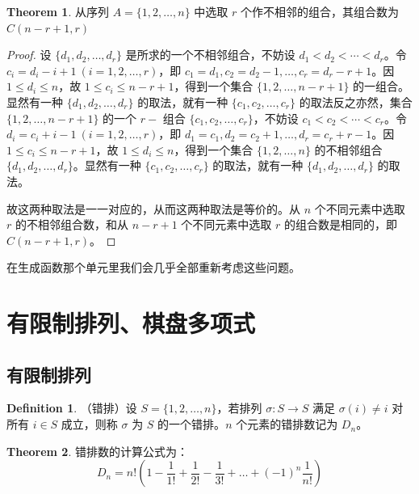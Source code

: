 \documentclass[oneside]{book}
\theoremstyle{definition}
\newtheorem{definition}{Definition}[section]
\newtheorem{theorem}{Theorem}[section]
\begin{document}
\begin{theorem}
	从序列 \( A=\{1,2,\ldots,n\} \) 中选取 \( r \) 个作不相邻的组合，其组合数为 \( C(n-r+1,r) \)
\end{theorem}
\begin{proof}
	设 \(\{d_1, d_2, \ldots, d_r\}\) 是所求的一个不相邻组合，不妨设 \(d_1 < d_2 < \cdots < d_r\)。令 \(c_i = d_i - i + 1 \ (i = 1, 2, \ldots, r)\)，即 \(c_1 = d_1, c_2 = d_2 - 1, \ldots, c_r = d_r - r + 1\)。因 \(1 \leq d_i \leq n\)，故 \(1 \leq c_i \leq n - r + 1\)，得到一个集合 \(\{1, 2, \ldots, n - r + 1\}\) 的一组合。显然有一种 \(\{d_1, d_2, \ldots, d_r\}\) 的取法，就有一种 \(\{c_1, c_2, \ldots, c_r\}\) 的取法反之亦然，集合 \(\{1, 2, \ldots, n - r + 1\}\) 的一个 \(r-\) 组合 \(\{c_1, c_2, \ldots, c_r\}\)，不妨设 \(c_1 < c_2 < \cdots < c_r\)。令 \(d_i = c_i + i - 1 \ (i = 1, 2, \ldots, r)\)，即 \(d_1 = c_1, d_2 = c_2 + 1, \ldots, d_r = c_r + r - 1\)。因 \(1 \leq c_i \leq n - r + 1\)，故 \(1 \leq d_i \leq n\)，得到一个集合 \(\{1, 2, \ldots, n\}\) 的不相邻组合 \(\{d_1, d_2, \ldots, d_r\}\)。显然有一种 \(\{c_1, c_2, \ldots, c_r\}\) 的取法，就有一种 \(\{d_1, d_2, \ldots, d_r\}\) 的取法。
	
	故这两种取法是一一对应的，从而这两种取法是等价的。从 \(n\) 个不同元素中选取 \(r\) 的不相邻组合数，和从 \(n - r + 1\) 个不同元素中选取 \(r\) 的组合数是相同的，即 \(C(n - r + 1, r)\)。
\end{proof}
在生成函数那个单元里我们会几乎全部重新考虑这些问题。

	\section{有限制排列、棋盘多项式}
	\subsection{有限制排列}
	\begin{definition}
		（错排）设 \( S = \{1, 2, \dots, n\} \)，若排列 \( \sigma: S \to S \) 满足 \( \sigma(i) \neq i \) 对所有 \( i \in S \) 成立，则称 \( \sigma \) 为 \( S \) 的一个错排。\( n \) 个元素的错排数记为 \( D_n \)。
	\end{definition}
	
	\begin{theorem}
		错排数的计算公式为：
		\[
		D_n = n! \left( 1 - \frac{1}{1!} + \frac{1}{2!} - \frac{1}{3!} + \dots + (-1)^n \frac{1}{n!} \right)
		\]
	\end{theorem}
	
\end{document}
